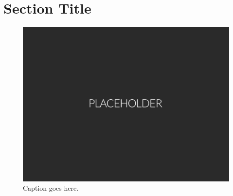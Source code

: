 \section{Section Title}

\lipsum[5-7] \cite{cite1}

\begin{figure}[H]
\hypertarget{fig1}{}
\centering
\includegraphics[width=0.5\columnwidth]{fig/placeholder.pdf}
\caption{Caption goes here.}
\end{figure}

\lipsum[8-9]